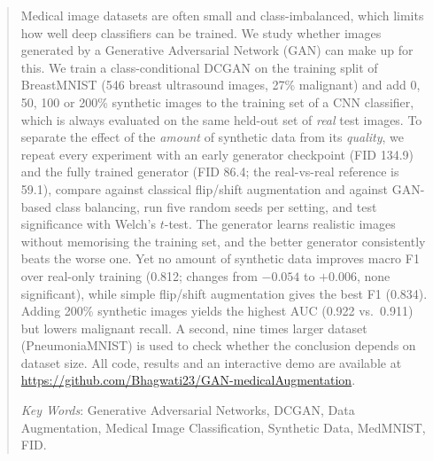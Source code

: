 
\begin{abstract}
Medical image datasets are often small and class-imbalanced, which limits how well deep classifiers can be trained.
We study whether images generated by a Generative Adversarial Network (GAN) can make up for this.
We train a class-conditional DCGAN on the training split of BreastMNIST (546 breast ultrasound images, 27\% malignant)
and add 0, 50, 100 or 200\% synthetic images to the training set of a CNN classifier, which is always evaluated on the
same held-out set of \emph{real} test images. To separate the effect of the \emph{amount} of synthetic data from its
\emph{quality}, we repeat every experiment with an early generator checkpoint (FID 134.9) and the fully trained
generator (FID 86.4; the real-vs-real reference is 59.1), compare against classical flip/shift augmentation and
against GAN-based class balancing, run five random seeds per setting, and test significance with Welch's $t$-test.
The generator learns realistic images without memorising the training set, and the better generator consistently beats
the worse one. Yet no amount of synthetic data improves macro F1 over real-only training (0.812; changes from $-0.054$ to
$+0.006$, none significant), while simple flip/shift augmentation gives the best F1 (0.834). Adding 200\% synthetic images
yields the highest AUC (0.922 vs.\ 0.911) but lowers malignant recall.
A second, nine times larger dataset (PneumoniaMNIST) is used to check whether the conclusion depends on dataset size.
All code, results and an interactive demo are available at \url{https://github.com/Bhagwati23/GAN-medicalAugmentation}.

\vspace{0.5cm}
\noindent
{\em Key Words}: Generative Adversarial Networks, DCGAN, Data Augmentation, Medical Image Classification,
Synthetic Data, MedMNIST, FID.
\end{abstract}
\hrulefill

